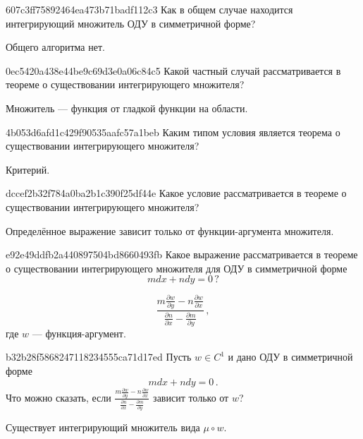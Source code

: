 \begin{note}{607c3ff75892464ea473b71badf112c3}
    Как в общем случае находится интегрирующий множитель ОДУ в симметричной форме?

    \begin{cloze}{1}
        Общего алгоритма нет.
    \end{cloze}
\end{note}

\begin{note}{0ec5420a438e44be9c69d3e0a06c84c5}
    Какой частный случай рассматривается в теореме о существовании интегрирующего множителя?

    \begin{cloze}{1}
        Множитель --- функция от гладкой функции на области.
    \end{cloze}
\end{note}

\begin{note}{4b053d6afd1c429f90535aafc57a1beb}
    Каким типом условия является теорема о существовании интегрирующего множителя?

    \begin{cloze}{1}
        Критерий.
    \end{cloze}
\end{note}

\begin{note}{dccef2b32f784a0ba2b1c390f25df44e}
    Какое условие рассматривается в теореме о существовании интегрирующего множителя?

    \begin{cloze}{1}
        Определённое выражение зависит только от функции-аргумента множителя.
    \end{cloze}
\end{note}

\begin{note}{e92e49ddfb2a440897504bd8660493fb}
    Какое выражение рассматривается в теореме о существовании интегрирующего множителя для ОДУ в симметричной форме
    \[
        m dx + n dy = 0\,?
    \]

    \begin{cloze}{1}
        \[
            \frac{m \frac{\partial w}{\partial y} - n \frac{\partial w}{\partial x}}{\frac{\partial n}{\partial x} - \frac{\partial m}{\partial y}}\,,
        \]
        где \({ w }\) --- функция-аргумент.
    \end{cloze}
\end{note}

\begin{note}{b32b28f5868247118234555ca71d17ed}
    Пусть \({ w \in C^1 }\) и дано ОДУ в симметричной форме
    \[
        m dx + n dy = 0\,.
    \]
    Что можно сказать, если \({ \frac{m \frac{\partial w}{\partial y} - n \frac{\partial w}{\partial x}}{\frac{\partial n}{\partial x} - \frac{\partial m}{\partial y}} }\) зависит только от \({ w }\)?

    \begin{cloze}{1}
        Существует интегрирующий множитель вида \({ \mu \circ w }\).
    \end{cloze}
\end{note}

